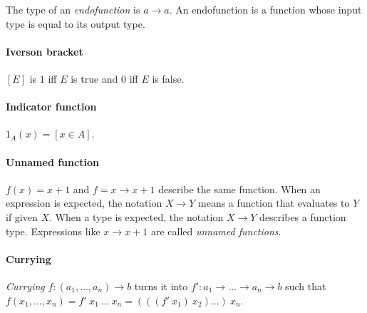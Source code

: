%
The type of an \emph{endofunction} is \(a \to a\).
An endofunction is a function whose input type is equal to its output type.

%
\paragraph{Iverson bracket}
\([E]\) is \(1\) iff \(E\) is true
and \(0\) iff \(E\) is false.

%
\paragraph{Indicator function}
\(1_A(x) = [x \in A]\).

%
\paragraph{Unnamed function}
\(f(x) = x + 1\) and \(f = x \to x+1\) describe the same function.
When an expression is expected, the notation \(X \to Y\)
means a function that evaluates to \(Y\) if given \(X\).
When a type is expected, the notation \(X \to Y\) describes a function type.
Expressions like \(x \to x + 1\) are called \emph{unnamed functions}.

\paragraph{Currying}
%
%
\emph{Currying} \(f : (a_1,\ldots,a_n) \to b\) turns it into \(f' : a_1 \to \ldots \to a_n \to b\)
such that \(f(x_1,\ldots,x_n)
= f'~x_1~\ldots~x_n
= (((f'~x_1)~x_2)\ldots)~x_n\).
